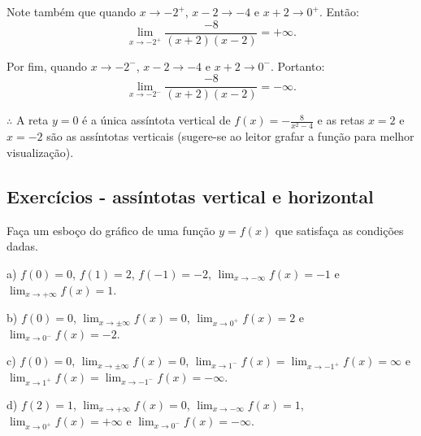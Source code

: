 \documentclass{article}
\begin{document}
{\begin{newpage}
\par Note também que quando $x\rightarrow -2^{+}$, $x-2\rightarrow -4$ e $x+2\rightarrow 0^{+}$. Então:
\begin{equation*} \displaystyle{\lim_{x\to -2^{+}}} \frac{-8}{(x+2)(x-2)} = +\infty .\end{equation*}
\par Por fim, quando $x\rightarrow -2^{-}$, $x-2\rightarrow -4$ e $x+2\rightarrow 0^{-}$. Portanto:
\begin{equation*} \displaystyle{\lim_{x\to -2^{-}}} \frac{-8}{(x+2)(x-2)} = -\infty .\end{equation*}
\par $\therefore $ A reta $y=0$ é a única assíntota vertical de $\displaystyle{f(x) = -\frac{8}{x^2 - 4}}$ e as retas $x=2$ e $x=-2$ são as assíntotas verticais (sugere-se ao leitor grafar a função para melhor visualização).
\subsection{Exercícios - assíntotas vertical e horizontal}
\par
\begin{flushleft}
\hspace{12pt}Faça um esboço do gráfico de uma função $y=f(x)$ que satisfaça as condições dadas.
\end{flushleft}
\par
a) $f(0)=0$, $f(1)=2$, $f(-1)=-2$, $\displaystyle{\lim_{x\to -\infty }} f(x) = -1$ e $\displaystyle{\lim_{x\to +\infty }} f(x) = 1$.
\par
\vspace{0.3cm}
b) $f(0)=0$, $\displaystyle{\lim_{x\to \pm \infty }} f(x) = 0$, $\displaystyle{\lim_{x\to 0^{+}}} f(x) = 2$ e $\displaystyle{\lim_{x\to 0^{-}}} f(x) = -2$.
\par
\vspace{0.3cm}
c) $f(0)=0$, $\displaystyle{\lim_{x\to \pm \infty }} f(x) = 0$, $\displaystyle{\lim_{x\to 1^{-}}} f(x) =\displaystyle{\lim_{x\to -1^{+}}} f(x) = \infty $ e $\displaystyle{\lim_{x\to 1^{+}}} f(x) = \displaystyle{\lim_{x\to -1^{-}}} f(x) = -\infty $.
\par
\vspace{0.3cm}
d) $f(2)=1$, $\displaystyle{\lim_{x\to +\infty }} f(x) = 0$, $\displaystyle{\lim_{x\to -\infty }} f(x) = 1$, $\displaystyle{\lim_{x\to 0^{+}}} f(x) = +\infty $ e $\displaystyle{\lim_{x\to 0^{-}}} f(x) = -\infty $.
\par
\vspace{0.3cm}

\end{newpage}}
\end{document}
